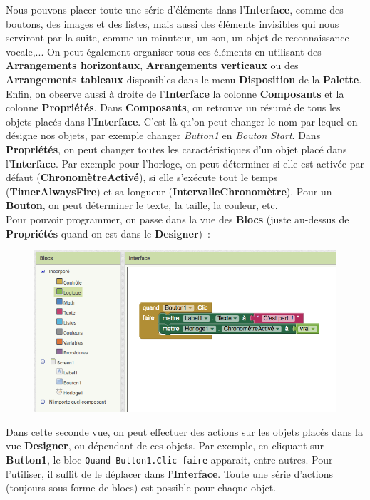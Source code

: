\documentclass[12t,a4paper]{article}
\begin{document}
Nous pouvons placer toute une série d'éléments dans l'\textbf{Interface}, comme des boutons, des images et des listes, mais aussi des éléments invisibles qui nous serviront par la suite, comme un minuteur, un son, un objet de reconnaissance vocale,... On peut également organiser tous ces éléments en utilisant des \textbf{Arrangements horizontaux}, \textbf{Arrangements verticaux} ou des \textbf{Arrangements tableaux} disponibles dans le menu \textbf{Disposition} de la \textbf{Palette}.\\

Enfin, on observe aussi à droite de l'\textbf{Interface} la colonne \textbf{Composants} et la colonne \textbf{Propriétés}. Dans \textbf{Composants}, on retrouve un résumé de tous les objets placés dans l'\textbf{Interface}. C'est là qu'on peut changer le nom par lequel on désigne nos objets, par exemple changer \textit{Button1} en \textit{Bouton Start}. Dans \textbf{Propriétés}, on peut changer toutes les caractéristiques d'un objet placé dans l'\textbf{Interface}. Par exemple pour l'horloge, on peut déterminer si elle est activée par défaut (\textbf{ChronomètreActivé}), si elle s'exécute tout le temps (\textbf{TimerAlwaysFire}) et sa longueur (\textbf{IntervalleChronomètre}). Pour un \textbf{Bouton}, on peut déterminer le texte, la taille, la couleur, etc.\\

Pour  pouvoir programmer, on passe dans la vue des \textbf{Blocs} (juste au-dessus de \textbf{Propriétés} quand on est dans le \textbf{Designer})~:
\begin{figure}[h!]
\begin{center}
\includegraphics[scale=0.5]{Blocks.png}
\end{center}
\end{figure}

Dans cette seconde vue, on peut effectuer des actions sur les objets placés dans la vue \textbf{Designer}, ou dépendant de ces objets. Par exemple, en cliquant sur \textbf{Button1}, le bloc \texttt{Quand Button1.Clic faire} apparait, entre autres. Pour l'utiliser, il suffit de le déplacer dans l'\textbf{Interface}. Toute une série d'actions (toujours sous forme de blocs) est possible pour chaque objet.\\
\end{document}

